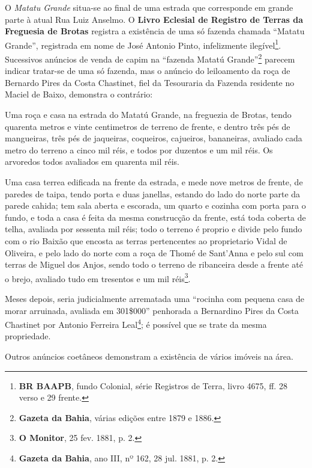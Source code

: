 O \textit{Matatu Grande} situa-se ao final de uma estrada que corresponde em grande parte à atual Rua Luiz Anselmo. O \textbf{Livro Eclesial de Registro de Terras da Freguesia de Brotas} registra a existência de uma só fazenda chamada ``Matatu Grande'', registrada em nome de José Antonio Pinto, infelizmente ilegível\footnote{\textbf{BR BAAPB}, fundo Colonial, série Registros de Terra, livro 4675, ff. 28 verso e 29 frente.}. Sucessivos anúncios de venda de capim na ``fazenda Matatú Grande''\footnote{\textbf{Gazeta da Bahia}, várias edições entre 1879 e 1886.} parecem indicar tratar-se de uma só fazenda, mas o anúncio do leiloamento da roça de Bernardo Pires da Costa Chastinet, fiel da Tesouraria da Fazenda residente no Maciel de Baixo, demonstra o contrário:

\begin{citacao}
Uma roça e casa na estrada do Matatú Grande, na freguezia de Brotas, tendo quarenta metros e vinte centimetros de terreno de frente, e dentro três pés de mangueiras, três pés de jaqueiras, coqueiros, cajueiros, bananeiras, avaliado cada metro do terreno a cinco mil réis, e todos por duzentos e um mil réis. Os arvoredos todos avaliados em quarenta mil réis.

Uma casa terrea edificada na frente da estrada, e mede nove metros de frente, de paredes de taipa, tendo porta e duas janellas, estando do lado do norte parte da parede cahida; tem sala aberta e escorada, um quarto e cozinha com porta para o fundo, e toda a casa é feita da mesma construcção da frente, está toda coberta de telha, avaliada por sessenta mil réis; todo o terreno é proprio e divide pelo fundo com o rio Baixão que encosta as terras pertencentes ao proprietario Vidal de Oliveira, e pelo lado do norte com a roça de Thomé de Sant'Anna e pelo sul com terras de Miguel dos Anjos, sendo todo o terreno de ribanceira desde a frente até o brejo, avaliado tudo em tresentos e um mil réis\footnote{\textbf{O Monitor}, 25 fev. 1881, p. 2.}.
\end{citacao}

Meses depois, seria judicialmente arrematada uma ``rocinha com pequena casa de morar arruinada, avaliada em 301\$000'' penhorada a Bernardino Pires da Costa Chastinet por Antonio Ferreira Leal\footnote{\textbf{Gazeta da Bahia}, ano III, nº 162, 28 jul. 1881, p. 2.}; é possível que se trate da mesma propriedade. 

Outros anúncios coetâneos demonstram a existência de vários imóveis na área.

